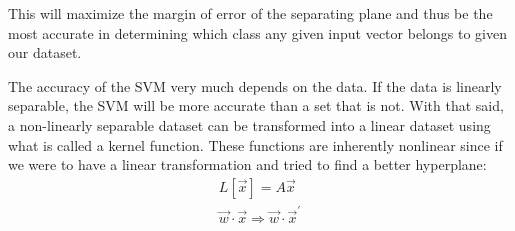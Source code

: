 This will maximize the margin of error of the separating plane and thus be the most accurate in determining which class any given input vector belongs to given our dataset. 

The accuracy of the SVM very much depends on the data. If the data is linearly separable, the SVM will be more accurate than a set that is not. With that said, a non-linearly separable dataset can be transformed into a linear dataset using what is called a kernel function. These functions are inherently nonlinear since if we were to have a linear transformation and tried to find a better hyperplane:
\begin{equation}
\begin{gathered}
	L[\vec{x}] = A\vec{x} \\
	\vec{w}\cdot \vec{x} \Rightarrow \vec{w} \cdot \vec{x}^{'} 
\end{gathered}
\end{equation}

